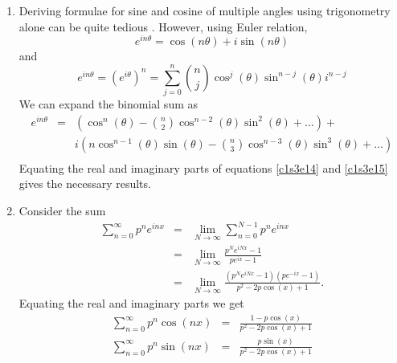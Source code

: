 \begin{enumerate}
\item Deriving formulae for sine and cosine of multiple angles using 
trigonometry alone can be quite tedious \cite{aw}. However, using Euler 
relation,
\begin{equation}\label{c1s3e14}
e^{in\theta} = \cos(n\theta) + i\sin(n\theta)
\end{equation}
and 
\[
e^{in\theta} = \left(e^{i\theta}\right)^n = \sum_{j=0}^n\binom{n}{j}\cos^j
(\theta)\sin^{n-j}(\theta)i^{n-j}
\]
We can expand the binomial sum as
\begin{eqnarray}
e^{in\theta} &=& 
\left(\cos^n(\theta)-\binom{n}{2}\cos^{n-2}(\theta)\sin^2(\theta)+\ldots\right) 
 + \nonumber \\
 & &i\left(n\cos^{n-1}(\theta)\sin(\theta)-\binom{n}{3}\cos^{n-3}(\theta)
  \sin^3(\theta) + \ldots\right)  \nonumber \\
 \label{c1s3e15}
\end{eqnarray}
Equating the real and imaginary parts of equations \eqref{c1s3e14} and 
\eqref{c1s3e15} gives the necessary results.

\item Consider the sum \cite{aw}
\begin{eqnarray*}
\sum_{n=0}^\infty p^ne^{inx} &=&
 \lim_{N \rightarrow \infty}\sum_{n=0}^{N-1}p^n e^{inx} \\
 &=& \lim_{N \rightarrow \infty}\frac{p^Ne^{iNx}-1}{pe^{ix}-1} \\
 &=& \lim_{N \rightarrow \infty}\frac{(p^Ne^{iNx}-1)(pe^{-ix}-1)}
                                     {p^2 - 2p\cos(x) + 1}.
\end{eqnarray*}
Equating the real and imaginary parts we get
\begin{eqnarray}
\sum_{n=0}^\infty p^n\cos(nx) &=& \frac{1 - p\cos(x)}{p^2 - 2p\cos(x) + 1} 
\label{c1s3e16} \\
\sum_{n=0}^\infty p^n\sin(nx) &=& \frac{p\sin(x)}{p^2 - 2p\cos(x) + 1} 
\label{c1s3e17} 
\end{eqnarray}


\end{enumerate}
